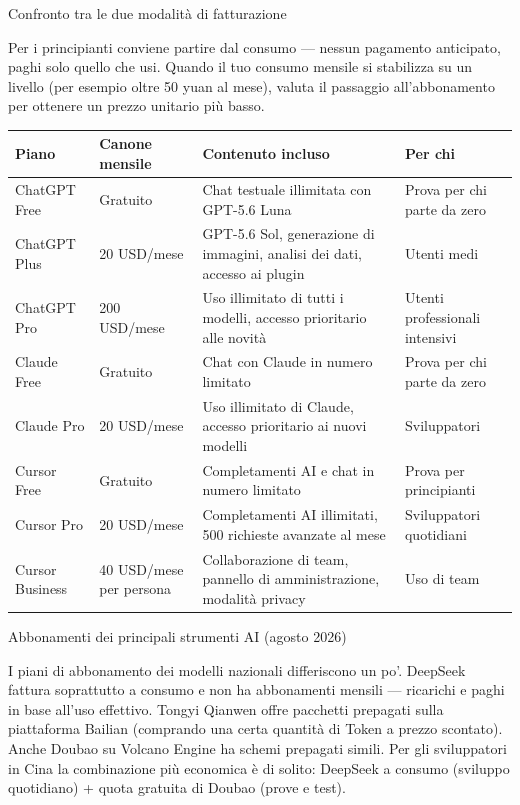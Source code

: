 \begin{center}\small\color{gray}Confronto tra le due modalità di fatturazione\end{center}

Per i principianti conviene partire dal consumo — nessun pagamento anticipato, paghi solo quello che usi. Quando il tuo consumo mensile si stabilizza su un livello (per esempio oltre 50 yuan al mese), valuta il passaggio all'abbonamento per ottenere un prezzo unitario più basso.


\begin{center}
\begin{tabularx}{\linewidth}{|X|X|X|X|}
\hline
\textbf{Piano} & \textbf{Canone mensile} & \textbf{Contenuto incluso} & \textbf{Per chi} \tabularnewline
\hline
ChatGPT Free & Gratuito & Chat testuale illimitata con GPT-5.6 Luna & Prova per chi parte da zero \tabularnewline
ChatGPT Plus & 20 USD/mese & GPT-5.6 Sol, generazione di immagini, analisi dei dati, accesso ai plugin & Utenti medi \tabularnewline
ChatGPT Pro & 200 USD/mese & Uso illimitato di tutti i modelli, accesso prioritario alle novità & Utenti professionali intensivi \tabularnewline
Claude Free & Gratuito & Chat con Claude in numero limitato & Prova per chi parte da zero \tabularnewline
Claude Pro & 20 USD/mese & Uso illimitato di Claude, accesso prioritario ai nuovi modelli & Sviluppatori \tabularnewline
Cursor Free & Gratuito & Completamenti AI e chat in numero limitato & Prova per principianti \tabularnewline
Cursor Pro & 20 USD/mese & Completamenti AI illimitati, 500 richieste avanzate al mese & Sviluppatori quotidiani \tabularnewline
Cursor Business & 40 USD/mese per persona & Collaborazione di team, pannello di amministrazione, modalità privacy & Uso di team \tabularnewline
\hline
\end{tabularx}
\end{center}

\begin{center}\small\color{gray}Abbonamenti dei principali strumenti AI (agosto 2026)\end{center}

I piani di abbonamento dei modelli nazionali differiscono un po'. DeepSeek fattura soprattutto a consumo e non ha abbonamenti mensili — ricarichi e paghi in base all'uso effettivo. Tongyi Qianwen offre pacchetti prepagati sulla piattaforma Bailian (comprando una certa quantità di Token a prezzo scontato). Anche Doubao su Volcano Engine ha schemi prepagati simili. Per gli sviluppatori in Cina la combinazione più economica è di solito: DeepSeek a consumo (sviluppo quotidiano) + quota gratuita di Doubao (prove e test).

